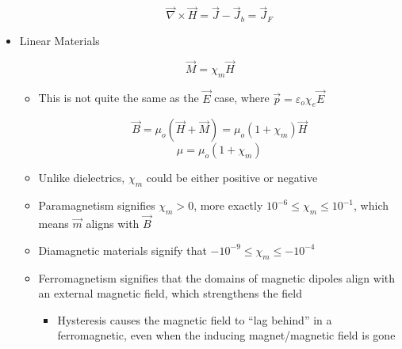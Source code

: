 \begin{itemize}
\begin{itemize}
        $$\vec{\nabla}\times\vec{H}=\vec{J}-\vec{J}_b=\vec{J}_F$$

    \end{itemize}

  \item Linear Materials

    $$\vec{M}=\chi_m\vec{H}$$

    \begin{itemize}

      \item This is not quite the same as the $\vec{E}$ case, where $\vec{p}=\varepsilon_o\chi_e\vec{E}$


        $$\vec{B}=\mu_o(\vec{H}+\vec{M})=\mu_o(1+\chi_m)\vec{H}$$
        $$\mu=\mu_o(1+\chi_m)$$

      \item Unlike dielectrics, $\chi_m$ could be either positive or negative

      \item Paramagnetism signifies $\chi_m>0$, more exactly $10^{-6}\leq\chi_m\leq10^{-1}$, which means $\vec{m}$ aligns with $\vec{B}$

      \item Diamagnetic materials signify that $-10^{-9}\leq\chi_m\leq-10^{-4}$

      \item Ferromagnetism signifies that the domains of magnetic dipoles align with an external magnetic field, which strengthens the field

        \begin{itemize}

          \item Hysteresis causes the magnetic field to ``lag behind'' in a ferromagnetic, even when the inducing magnet/magnetic field is gone

        \end{itemize}

    \end{itemize}

\end{itemize}



